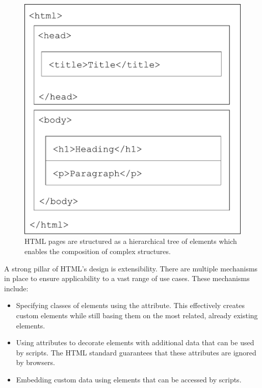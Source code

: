 \begin{figure}[tp]
\centering
\includegraphics[keepaspectratio,width=\linewidth,height=\halfh]
{diagrams/html-structure.pdf}

\caption[Structure of HTML pages]{
HTML pages are structured as a hierarchical tree of elements
which enables the composition of complex structures.
}
\label{fig:HTMLStructure}
\end{figure}


A strong pillar of HTML's design is extensibility. There are multiple
mechanisms in place to ensure applicability to a vast range of use
cases. These mechanisms include:

\begin{itemize}
\item Specifying classes of elements using the 
  attribute. This effectively creates custom elements while still
  basing them on the most related, already existing elements.

\item Using  attributes to decorate elements with
  additional data that can be used by scripts. The HTML standard
  guarantees that these attributes are ignored by browsers.

\item Embedding custom data using 
  elements that can be accessed by scripts.
\end{itemize}







